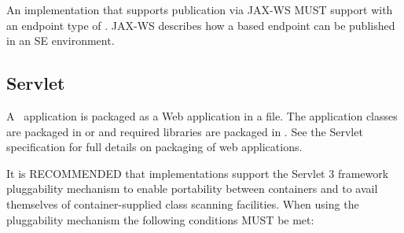 An implementation that supports publication via JAX-WS MUST support  with an endpoint type of . JAX-WS describes how a  based endpoint can be published in an SE environment.

\subsection{Servlet}
\label{servlet}

A \jaxrs\ application is packaged as a Web application in a  file. The application classes are packaged in  or  and required libraries are packaged in . See the Servlet specification for full details on packaging of web applications.

It is RECOMMENDED that implementations support the Servlet 3 framework pluggability mechanism to enable portability between containers and to avail themselves of container-supplied class scanning facilities. When using the pluggability mechanism the following conditions MUST be met:

